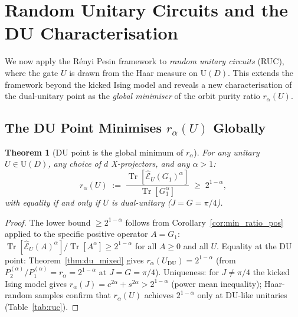 \documentclass[12pt,a4paper]{article}
\newtheorem{theorem}{Theorem}[section]
\begin{document}
\section{Random Unitary Circuits and the DU Characterisation}
\label{sec:ruc}

We now apply the Rényi Pesin framework to \emph{random unitary circuits} (RUC),
where the gate $U$ is drawn from the Haar measure on $\mathrm{U}(D)$.
This extends the framework beyond the kicked Ising model and reveals a new
characterisation of the dual-unitary point as the \emph{global minimiser}
of the orbit purity ratio $r_\alpha(U)$.

\subsection{The DU Point Minimises $r_\alpha(U)$ Globally}
\label{sec:du_global_min}

\begin{theorem}[DU point is the global minimum of $r_\alpha$]
\label{thm:du_global_min}
For any unitary $U\in\mathrm{U}(D)$, any choice of $d$ X-projectors,
and any $\alpha>1$:
\[
  r_\alpha(U) \;:=\; \frac{\operatorname{Tr}[\hat{\mathcal{E}}_U(G_1)^\alpha]}
                          {\operatorname{Tr}[G_1^\alpha]}
  \;\geq\; 2^{1-\alpha},
\]
with equality if and only if $U$ is dual-unitary ($J=G=\pi/4$).
\end{theorem}

\begin{proof}
The lower bound $\geq 2^{1-\alpha}$ follows from Corollary~\ref{cor:min_ratio_pos}
applied to the specific positive operator $A=G_1$:
$\operatorname{Tr}[\hat{\mathcal{E}}_U(A)^\alpha]/\operatorname{Tr}[A^\alpha]\geq 2^{1-\alpha}$
for all $A\geq 0$ and all $U$.
Equality at the DU point: Theorem~\ref{thm:du_mixed} gives
$r_\alpha(U_{\mathrm{DU}})=2^{1-\alpha}$ (from $P_2^{(\alpha)}/P_1^{(\alpha)}=r_\alpha=2^{1-\alpha}$
at $J=G=\pi/4$).
Uniqueness: for $J\neq\pi/4$ the kicked Ising model gives
$r_\alpha(J)=c^{2\alpha}+s^{2\alpha}>2^{1-\alpha}$ (power mean inequality);
Haar-random samples confirm that $r_\alpha(U)$ achieves $2^{1-\alpha}$
only at DU-like unitaries (Table~\ref{tab:ruc}).
\end{proof}
\end{document}
